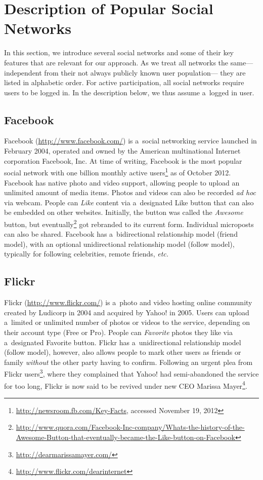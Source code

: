 \section{Description of Popular Social Networks}
\label{sec:description-of-popular-social-networks}

In this section, we introduce several social networks
and some of their key features
that are relevant for our approach.
As we treat all networks the same---%
independent from their not always publicly known user population---%
they are listed in alphabetic order.
For active participation,
all social networks require users to be logged in.
In the description below, we thus assume a~logged in user.

\subsection{Facebook}

Facebook (\url{http://www.facebook.com/})
is a~social networking service launched in February 2004,
operated and owned by the American multinational
Internet corporation Facebook, Inc.
At time of writing, Facebook is the most popular social network
with one billion monthly active
users\footnote{\url{http://newsroom.fb.com/Key-Facts},
accessed November 19, 2012}
as of October 2012.
Facebook has native photo and video support,
allowing people to upload an unlimited amount of media items.
Photos and videos can also be recorded \emph{ad hoc} via webcam.
People can \emph{Like} content via a~designated Like button
that can also be embedded on other websites.
Initially, the button was called the \emph{Awesome} button,
but eventually\footnote{\url{http://www.quora.com/Facebook-Inc-company/Whats-the-history-of-the-Awesome-Button-that-eventually-became-the-Like-button-on-Facebook}}
got rebranded to its current form.
Individual microposts can also be shared.
Facebook has a~bidirectional relationship model (friend model),
with an optional unidirectional relationship model (follow model),
typically for following celebrities, remote friends, \emph{etc.}

\subsection{Flickr}

Flickr (\url{http://www.flickr.com/})
is a~photo and video hosting online community
created by Ludicorp in 2004 and acquired by Yahoo! in 2005.
Users can upload a~limited or unlimited number of photos or videos
to the service, depending on their account type (Free or Pro).
People can \emph{Favorite} photos they like
via a~designated Favorite button.
Flickr has a~unidirectional relationship model (follow model),
however, also allows people to mark other users as friends
or family \emph{without} the other party having to confirm.
Following an urgent plea from Flickr
users\footnote{\url{http://dearmarissamayer.com/}},
where they complained that Yahoo!
had semi-abandoned the service for too long,
Flickr is now said to be revived under new CEO Marissa
Mayer\footnote{\url{http://www.flickr.com/dearinternet}}.

